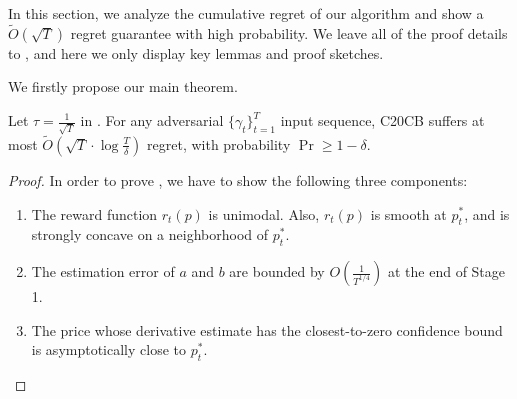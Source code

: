 In this section, we analyze the cumulative regret of our algorithm and show a $\tilde{O}(\sqrt{T})$ regret guarantee with high probability. We leave all of the proof details to , and here we only display key lemmas and proof sketches.

We firstly propose our main theorem.
\begin{theorem}[Regret]
    \label{thm:regret}
    Let $\tau=\frac1{\sqrt{T}}$ in . For any adversarial $\{\gamma_t\}_{t=1}^T$ input sequence, C20CB suffers at most $\tilde{O}\left(\sqrt{T}\cdot\log\frac{T}{\delta}\right)$ regret, with probability $\Pr\geq 1-\delta$.
\end{theorem}

\begin{proof}
    \label{proof:thm_regret_sketch}
    In order to prove , we have to show the following three components:
    \begin{enumerate}
        \item The reward function $r_t(p)$ is unimodal. Also, $r_t(p)$ is smooth at $p_t^*$, and is strongly concave on a neighborhood of $p_t^*$.
        \item The estimation error of $a$ and $b$ are bounded by $O(\frac1{T^{1/4}})$ at the end of Stage 1.
        \item The price whose derivative estimate has the closest-to-zero confidence bound is asymptotically close to $p_t^*$.
    \end{enumerate}



\end{proof}
